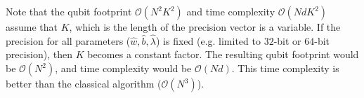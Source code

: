 \documentclass[12pt]{article}
\numberwithin{equation}{section}
\begin{document}
Note that the qubit footprint $\mathcal{O}(N^2K^2)$ and time complexity $\mathcal{O}(NdK^2)$ assume that $K$, which is the length of the precision vector is a variable.
If the precision for all parameters ($\hat{w},\hat{b},\hat{\lambda}$) is fixed (e.g. limited to $32$-bit or $64$-bit precision), then $K$ becomes a constant factor.
The resulting qubit footprint would be $\mathcal{O}(N^2)$, and time complexity would be $\mathcal{O}(N d)$.
This time complexity is better than the classical algorithm ($\mathcal{O}(N^3)$).
\end{document}
